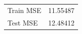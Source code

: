 \begin{tabular}{ll}
\toprule
\midrule
Train MSE & 11.55487 \\
Test MSE & 12.48412 \\
\bottomrule
\end{tabular}
